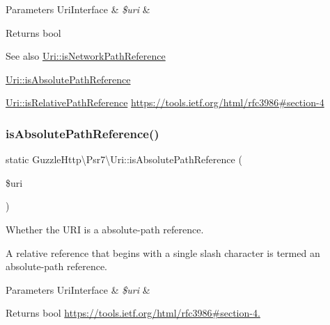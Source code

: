 \begin{DoxyParams}[1]{Parameters}
Uri\+Interface & {\em \$uri} & \\
\hline
\end{DoxyParams}
\begin{DoxyReturn}{Returns}
bool 
\end{DoxyReturn}
\begin{DoxySeeAlso}{See also}
\hyperlink{classGuzzleHttp_1_1Psr7_1_1Uri_ad1c4e868c38ac77b124c979cca3ae4e0}{Uri\+::is\+Network\+Path\+Reference} 

\hyperlink{classGuzzleHttp_1_1Psr7_1_1Uri_a1a4f72405456c0c0871aa9a3995f577c}{Uri\+::is\+Absolute\+Path\+Reference} 

\hyperlink{classGuzzleHttp_1_1Psr7_1_1Uri_a0a323a09016078d6174b90a5664578a6}{Uri\+::is\+Relative\+Path\+Reference} \hyperlink{}{https\+://tools.\+ietf.\+org/html/rfc3986\#section-\/4}
\end{DoxySeeAlso}
\mbox{\label{classGuzzleHttp_1_1Psr7_1_1Uri_a1a4f72405456c0c0871aa9a3995f577c}} 
\subsubsection{\texorpdfstring{is\+Absolute\+Path\+Reference()}{isAbsolutePathReference()}}
{\footnotesize\ttfamily static Guzzle\+Http\textbackslash{}\+Psr7\textbackslash{}\+Uri\+::is\+Absolute\+Path\+Reference (\begin{DoxyParamCaption}\item[{\hyperlink{interfacePsr_1_1Http_1_1Message_1_1UriInterface}{Uri\+Interface}}]{\$uri }\end{DoxyParamCaption})\hspace{0.3cm}{\ttfamily [static]}}

Whether the U\+RI is a absolute-\/path reference.

A relative reference that begins with a single slash character is termed an absolute-\/path reference.


\begin{DoxyParams}[1]{Parameters}
Uri\+Interface & {\em \$uri} & \\
\hline
\end{DoxyParams}
\begin{DoxyReturn}{Returns}
bool \hyperlink{}{https\+://tools.\+ietf.\+org/html/rfc3986\#section-\/4.}
\end{DoxyReturn}
\mbox{\label{classGuzzleHttp_1_1Psr7_1_1Uri_aabb058d1d5d95b7102bc36016bc9afdb}} 
